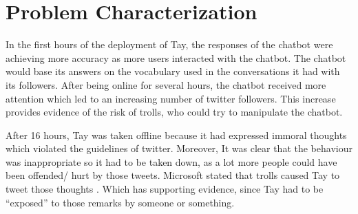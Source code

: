 \chapter{Problem Characterization}
In the first hours of the deployment of Tay, the responses of the chatbot were achieving more accuracy as more users interacted with the chatbot. The chatbot would base its answers on the vocabulary used in the conversations it had with its followers. After being online for several hours, the chatbot received more attention which led to an increasing number of twitter followers. This increase provides evidence of the risk of trolls, who could try to manipulate the chatbot.

After 16 hours, Tay was taken offline because it had expressed immoral thoughts which violated the guidelines of twitter. Moreover, It was clear that the behaviour was inappropriate so it had to be taken down, as a lot more people could have been offended/ hurt by those tweets. Microsoft stated that trolls caused Tay to tweet those thoughts \cite{microsoftstatement}. Which has supporting evidence, since Tay had to be “exposed” to those remarks by someone or something.

